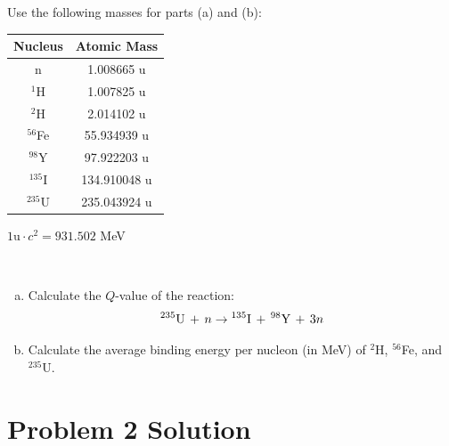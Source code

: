 \documentclass{report}
\begin{document}
Use the following masses for parts (a) and (b):

\begin{table}[htbp]
	\centering
	\begin{tabular}{|c|c|}
			\hline
			Nucleus		&	Atomic Mass \\
			\hline
			n 			&	 1.008665 u \\
			$^{1}$H		& 	 1.007825 u \\
			$^{2}$H 	&	 2.014102 u \\
			$^{56}$Fe	&   55.934939 u \\
			$^{98}$Y 	&   97.922203 u \\
			$^{135}$I	&  134.910048 u \\
			$^{235}$U	&  235.043924 u \\
			\hline
	\end{tabular}
	\label{tab:design-specs}
\end{table}
\begin{center}$1\text{u} \cdot c^{2} = 931.502$ MeV\end{center}
\-\\
\begin{enumerate}[a)]
\item Calculate the $Q$-value of the reaction:
$$ ^{235}\text{U}\, + \,n \-\rightarrow\- ^{135}\text{I}\, + \,^{98}\text{Y}\, + \,3n $$
\item Calculate the average binding energy per nucleon (in MeV) of $^{2}$H, $^{56}$Fe, and $^{235}$U.

\end{enumerate}



\section*{Problem 2 Solution}
\end{document}
